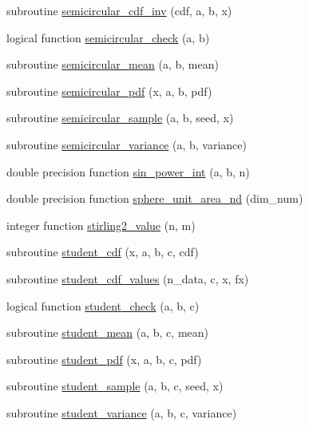 \begin{DoxyCompactItemize}
\item 
subroutine \hyperlink{subroutines_8f_a6d0ee2a8130e550cd689cd255ccc60cc}{semicircular\+\_\+cdf\+\_\+inv} (cdf, a, b, x)
\item 
logical function \hyperlink{subroutines_8f_a7190d7f0fbac6430ec693e54dc1aa636}{semicircular\+\_\+check} (a, b)
\item 
subroutine \hyperlink{subroutines_8f_ad13798246f26b503c71d03dc1397d510}{semicircular\+\_\+mean} (a, b, mean)
\item 
subroutine \hyperlink{subroutines_8f_a9f8895094b6821e14853bae849297fca}{semicircular\+\_\+pdf} (x, a, b, pdf)
\item 
subroutine \hyperlink{subroutines_8f_ab458959d3e85a81b418a1e703fda7ce7}{semicircular\+\_\+sample} (a, b, seed, x)
\item 
subroutine \hyperlink{subroutines_8f_a01f045ae1d9d3cb85e0de3e1d207f5f9}{semicircular\+\_\+variance} (a, b, variance)
\item 
double precision function \hyperlink{subroutines_8f_a11b103a7500f33e4679f27dcc250d7eb}{sin\+\_\+power\+\_\+int} (a, b, n)
\item 
double precision function \hyperlink{subroutines_8f_aaa5d69bd35accf7257e983f76d12cb87}{sphere\+\_\+unit\+\_\+area\+\_\+nd} (dim\+\_\+num)
\item 
integer function \hyperlink{subroutines_8f_a917c5cb6942b4f683a70b827c88476bd}{stirling2\+\_\+value} (n, m)
\item 
subroutine \hyperlink{subroutines_8f_a4b8711966343cd70dc9ead18b8252ad1}{student\+\_\+cdf} (x, a, b, c, cdf)
\item 
subroutine \hyperlink{subroutines_8f_a20e37e60ef6e1d53450d1096d6179ae2}{student\+\_\+cdf\+\_\+values} (n\+\_\+data, c, x, fx)
\item 
logical function \hyperlink{subroutines_8f_a33e0ec77dcaf5ed332a05ab10b34af0c}{student\+\_\+check} (a, b, c)
\item 
subroutine \hyperlink{subroutines_8f_adef794feac6716fffa86207bf008f854}{student\+\_\+mean} (a, b, c, mean)
\item 
subroutine \hyperlink{subroutines_8f_ad0cdf2c699e02784d889de817e73db3a}{student\+\_\+pdf} (x, a, b, c, pdf)
\item 
subroutine \hyperlink{subroutines_8f_a704ccb9e1dc4d1755ebb37a50d5687de}{student\+\_\+sample} (a, b, c, seed, x)
\item 
subroutine \hyperlink{subroutines_8f_a5fda95cb2ebc1ee3712f6b0d07243c22}{student\+\_\+variance} (a, b, c, variance)
\item 

\end{DoxyCompactItemize}
